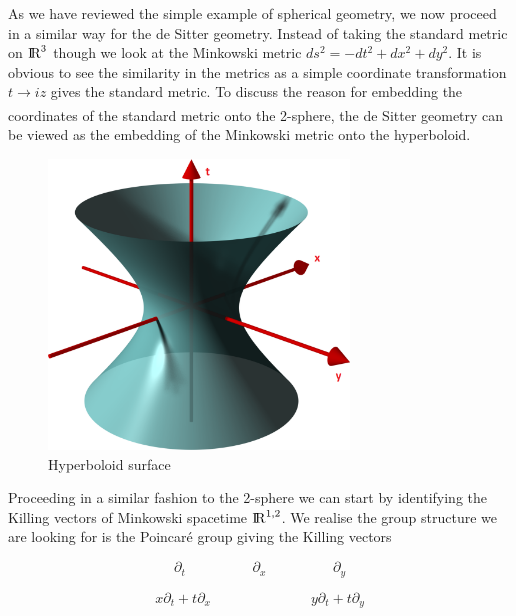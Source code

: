 \documentclass[a4paper,11pt]{article}
\numberwithin{equation}{section}
\numberwithin{figure}{section}
\begin{document}
\begin{large}
As we have reviewed the simple example of spherical geometry, we now proceed in a similar way for the de Sitter geometry. Instead of taking the standard metric on ${\rm I\!R}^3$ though we look at the Minkowski metric $ds^2=-dt^2+dx^2+dy^2$. It is obvious to see the similarity in the metrics as a simple coordinate transformation $t\xrightarrow[]{}iz$ gives the standard metric. To discuss the reason for embedding the coordinates of the standard metric onto the 2-sphere, the de Sitter geometry can be viewed as the embedding of the Minkowski metric onto the hyperboloid. 

\vspace{1.5cm}

\begin{figure}[h]
    \centering
    \includegraphics[width=8cm]{Hyperboloid.png}
    \caption{Hyperboloid surface}
    \label{fig:hyperboloid}
    
\end{figure}

\newpage

Proceeding in a similar fashion to the 2-sphere we can start by identifying the Killing vectors of Minkowski spacetime ${\rm I\!R}^{1,2}$. We realise the group structure we are looking for is the Poincar\'{e} group giving the Killing vectors

\begin{equation}
\label{eq:translation_dS}
    \partial_t
    \hspace{2cm}
    \partial_x
    \hspace{2cm}
    \partial_y
\end{equation}

\begin{equation}
\label{eq:boost}
    x\partial_t+t\partial_x 
    \hspace{3cm}
    y\partial_t+t\partial_y
\end{equation}


\end{large}
\end{document}
